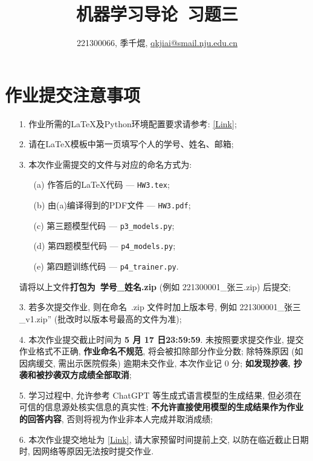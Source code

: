 \documentclass[a4paper,UTF8]{article}
\numberwithin{equation}{section}
\theoremstyle{definition}
\begin{document}
\title{机器学习导论\ 习题三}
\author{221300066, 季千焜, \href{mailto:邮箱}{qkjiai@smail.nju.edu.cn}}
\maketitle
\section*{作业提交注意事项}
\begin{tcolorbox}
	\begin{enumerate}
    \item[1.] 作业所需的LaTeX及Python环境配置要求请参考: \href{https://www.lamda.nju.edu.cn/ML2024Spring/supplemantary/environment.pdf}{[Link]};
		\item[2.] 请在LaTeX模板中第一页填写个人的学号、姓名、邮箱;
		\item[3.] 本次作业需提交的文件与对应的命名方式为:
            \begin{enumerate}
                \item [(a)] 作答后的LaTeX代码 --- \texttt{HW3.tex};
                \item [(b)] 由(a)编译得到的PDF文件 --- \texttt{HW3.pdf};
                \item [(c)] 第三题模型代码 --- \texttt{p3\_models.py};
                \item [(d)] 第四题模型代码 --- \texttt{p4\_models.py};
                \item [(e)] 第四题训练代码 --- \texttt{p4\_trainer.py}.
            \end{enumerate}
            请将以上文件{\color{red}\textbf{打包为~学号\hspace{0em}\_\hspace{0em}姓名.zip}} (例如 221300001\hspace{0em}\_\hspace{0em}张三.zip) 后提交;
		\item[3.] 若多次提交作业, 则在命名~.zip 文件时加上版本号, 例如 221300001\_\hspace{0em}张三\hspace{0em}\_v1.zip” (批改时以版本号最高的文件为准);
		\item[4.] 本次作业提交截止时间为 {\color{red}\textbf{ 5 月 17 日23:59:59}}. 未按照要求提交作业, 提交作业格式不正确, {\color{red}\textbf{作业命名不规范}}, 将会被扣除部分作业分数; 除特殊原因 (如因病缓交, 需出示医院假条) 逾期未交作业, 本次作业记 0 分; {\color{red}\textbf{如发现抄袭, 抄袭和被抄袭双方成绩全部取消}};
        \item[5.] 学习过程中, 允许参考 ChatGPT 等生成式语言模型的生成结果, 但必须在可信的信息源处核实信息的真实性; {\color{red}\textbf{不允许直接使用模型的生成结果作为作业的回答内容}}, 否则将视为作业非本人完成并取消成绩;
		\item[6.] 本次作业提交地址为 \href{https://box.nju.edu.cn/u/d/cf36400095e94f769e1d/}{[Link]}, 请大家预留时间提前上交, 以防在临近截止日期时, 因网络等原因无法按时提交作业.
	\end{enumerate}
\end{tcolorbox}
\newpage
\end{document}
